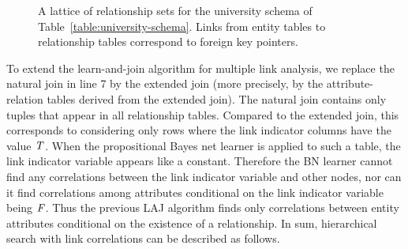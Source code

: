 \documentclass[runningheads,a4paper]{llncs}
\begin{document}
\begin{figure}[h]
\begin{center}
\caption{A lattice of relationship sets for the university schema of Table~\ref{table:university-schema}.
 Links from entity tables to relationship tables correspond to foreign key pointers. 
\label{fig:big-lattice}}
\end{center}
\end{figure}



To extend the learn-and-join algorithm for multiple link analysis, we replace the natural join in line 7 by the extended join (more precisely, by the attribute-relation tables derived from the extended join). 
The natural join contains only tuples that appear in all relationship tables. 
Compared to the extended join, this corresponds to considering only rows where the link indicator columns have the value $\mathit{T}$. 
When the propositional Bayes net learner is applied to such a table, the link indicator variable appears like a constant. 
Therefore the BN learner cannot find any correlations between the link indicator variable and other nodes, 
nor can it find correlations among attributes conditional on the link indicator variable being $\mathit{F}$. 
Thus the previous LAJ algorithm finds only correlations between entity attributes conditional on the existence of a relationship. 
In sum, hierarchical search with link correlations can be described as follows.
\end{document}

